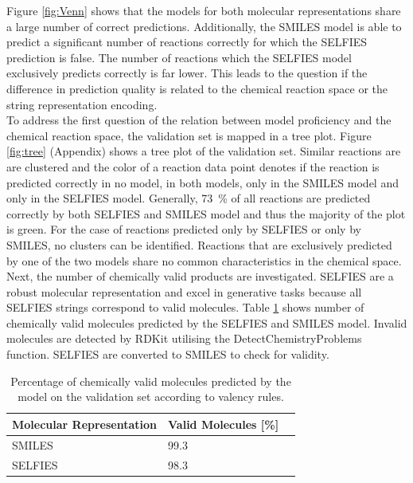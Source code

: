 \documentclass[10pt,conference,compsocconf]{IEEEtran}
\begin{document}
Figure \ref{fig:Venn} shows that the models for both molecular representations share a large number of correct predictions. Additionally, the SMILES model is able to predict a significant number of reactions correctly for which the SELFIES prediction is false. The number of reactions which the SELFIES model exclusively predicts correctly is far lower. This leads to the question if the difference in prediction quality is related to the chemical reaction space or the string representation encoding.\\

To address the first question of the relation between model proficiency and the chemical reaction space, the validation set is mapped in a tree plot\cite{schwaller2020mapping}. Figure \ref{fig:tree} (Appendix) shows a tree plot of the validation set. Similar reactions are are clustered and the color of a reaction data point denotes if the reaction is predicted correctly in no model, in both models, only in the SMILES model and only in the SELFIES model. Generally, 73~\% of all reactions are predicted correctly by both SELFIES and SMILES model and thus the majority of the plot is green. For the case of reactions predicted only by SELFIES or only by SMILES, no clusters can be identified. Reactions that are exclusively predicted by one of the two models share no common characteristics in the chemical space.\\

Next, the number of chemically valid products are investigated. SELFIES are a robust molecular representation and excel in generative tasks because all SELFIES strings correspond to valid molecules. Table \ref{tab:validity} shows number of chemically valid molecules predicted by the SELFIES and SMILES model. Invalid molecules are detected by RDKit utilising the DetectChemistryProblems function. SELFIES are converted to SMILES to check for validity.

\begin{table}[h]
  \centering
  \begin{tabular}[c]{|l|l|l|}
    \hline
    Molecular Representation & Valid Molecules [\%] \\
    \hline
    SMILES & 99.3 \\
    SELFIES & 98.3 \\
    \hline
  \end{tabular}
  \caption{Percentage of chemically valid molecules predicted by the model on the validation set according to valency rules.}
  \label{tab:validity}
\end{table}
\end{document}
